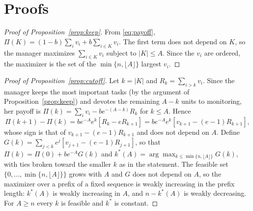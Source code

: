 \section{Proofs}
\label{app:proofs}

\begin{proof}[Proof of Proposition~\ref{prop:keep}]
From \eqref{eq:payoff}, $\Pi(K) = (1-b)\sum_i v_i + b \sum_{i \in K} v_i$. The first term does not depend on $K$, so the manager maximizes $\sum_{i \in K} v_i$ subject to $|K| \leq A$. Since the $v_i$ are ordered, the maximizer is the set of the $\min\{n, \lfloor A \rfloor\}$ largest $v_i$.
\end{proof}

\begin{proof}[Proof of Proposition~\ref{prop:cutoff}]
Let $k = |K|$ and $R_k = \sum_{i > k} v_i$. Since the manager keeps the most important tasks (by the argument of Proposition~\ref{prop:keep}) and devotes the remaining $A - k$ units to monitoring, her payoff is $\Pi(k) = \sum_i v_i - b e^{-(A-k)} R_k$ for $k \leq A$. Hence
\[
\Pi(k+1) - \Pi(k) = b e^{-A} e^{k} \left[ R_k - e R_{k+1} \right] = b e^{-A} e^{k} \left[ v_{k+1} - (e-1) R_{k+1} \right],
\]
whose sign is that of $v_{k+1} - (e-1) R_{k+1}$ and does not depend on $A$. Define $G(k) = \sum_{j < k} e^{j} \left[ v_{j+1} - (e-1) R_{j+1} \right]$, so that $\Pi(k) = \Pi(0) + b e^{-A} G(k)$ and $k^*(A) = \arg\max_{k \leq \min\{n, \lfloor A \rfloor\}} G(k)$, with ties broken toward the smaller $k$ as in the statement. The feasible set $\{0, \dots, \min\{n, \lfloor A \rfloor\}\}$ grows with $A$ and $G$ does not depend on $A$, so the maximizer over a prefix of a fixed sequence is weakly increasing in the prefix length: $k^*(A)$ is weakly increasing in $A$, and $n - k^*(A)$ is weakly decreasing. For $A \geq n$ every $k$ is feasible and $k^*$ is constant.
\end{proof}

